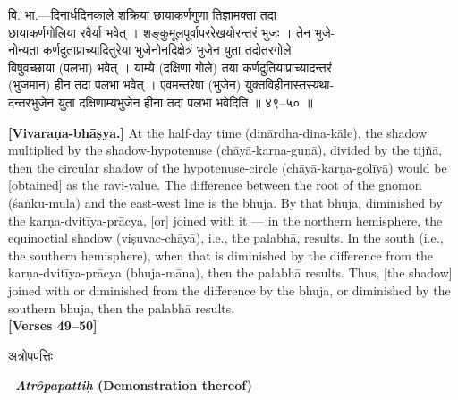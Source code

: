 \documentclass[11pt,a4paper]{article}
\newcommand{\dev}[1]{{\devanagarifont #1}}
\newcommand{\bilingualpair}[2]{%
  \noindent%
  \begin{minipage}[t]{0.48\textwidth}
    #1%
  \end{minipage}%
  \hfill%
  \begin{minipage}[t]{0.48\textwidth}
    #2%
  \end{minipage}%
  \par\vspace{0.5em}%
}
\newenvironment{sanskritcol}{\devanagarifont\small}{}
\newenvironment{englishcol}{\iastfont\small}{}
\begin{document}
\vspace{0.3cm}
\bilingualpair{%
\begin{sanskritcol}
\dev{वि. भा.---दिनार्धदिनकाले शक्रिया छायाकर्णगुणा तिज्ञामक्ता तदा}\\[0.3em]
\dev{छायाकर्णगोलिया रवैर्या भवेत् । शङ्कुमूलपूर्वापररेखयोरन्तरं भुजः । तेन भुजे-}\\[0.3em]
\dev{नोन्यता कर्णदुताप्राच्यादितुरेया भुजेनोनदिक्षेत्रं भुजेन युता तदोतरगोले}\\[0.3em]
\dev{विषुवच्छाया (पलभा) भवेत् । याम्ये (दक्षिणा गोले) तया कर्णदुतियाप्राच्यादन्तरं}\\[0.3em]
\dev{(भुजमान) हीन तदा पलभा भवेत् । एवमन्तरेषा (भुजेन) युक्तविहीनास्तस्यथा-}\\[0.3em]
\dev{दन्तरभुजेन युता दक्षिणाम्यभुजेन हीना तदा पलभा भवेदिति ॥ ४९--५० ॥}
\end{sanskritcol}%
}{%
\begin{englishcol}
\textbf{[Vivaraṇa-bhāṣya.]} At the half-day time (dinārdha-dina-kāle), the shadow multiplied by the shadow-hypotenuse (chāyā-karṇa-guṇā), divided by the tijñā, then the circular shadow of the hypotenuse-circle (chāyā-karṇa-golīyā) would be [obtained] as the ravi-value. The difference between the root of the gnomon (\'saṅku-mūla) and the east-west line is the bhuja. By that bhuja, diminished by the karṇa-\-dvitīya-\-prācya, [or] joined with it --- in the northern hemisphere, the equinoctial shadow (viṣuvac-chāyā), i.e., the palabhā, results. In the south (i.e., the southern hemisphere), when that is diminished by the difference from the karṇa-\-dvitīya-\-prācya (bhuja-māna), then the palabhā results. Thus, [the shadow] joined with or diminished from the difference by the bhuja, or diminished by the southern bhuja, then the palabhā results.\\[0.3em]
\hfill \textbf{[Verses 49--50]}
\end{englishcol}%
}

\vspace{0.5cm}
\bilingualpair{%
\begin{sanskritcol}
\dev{अत्रोपपत्तिः}
\end{sanskritcol}%
}{%
\begin{englishcol}
\textbf{\textbar\ \textit{Atrôpapattiḥ} (Demonstration thereof)}
\end{englishcol}%
}
\end{document}
